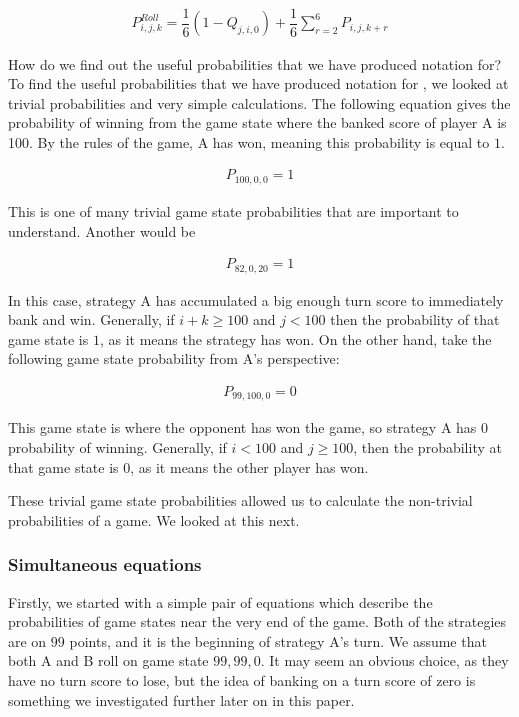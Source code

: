 \documentclass[a4paper,titlepage]{article}
\begin{document}
\begin{align*}
P^{Roll}_{i,j,k} = \dfrac{1}{6} (1-Q_{j,i,0}) + \dfrac{1}{6}\sum^{6}_{r=2}P_{i,j,k+r}
\end{align*}

How do we find out the useful probabilities that we have produced notation for? To find the useful probabilities that we have produced notation for , we looked at trivial probabilities and very simple calculations. The following equation gives the probability of winning from the game state where the banked score of player A is 100. By the rules of the game, A has won, meaning this probability is equal to $1$.

\begin{align*}
	P_{100,0,0}=1
\end{align*}

This is one of many trivial game state probabilities that are important to understand. Another would be

\begin{align*}
	P_{82,0,20}=1
\end{align*}

In this case, strategy A has accumulated a big enough turn score to immediately bank and win. Generally, if $i+k\geq100$ and $j<100$ then the probability of that game state is $1$, as it means the strategy has won. On the other hand, take the following game state probability from A's perspective:

\begin{align*}
	P_{99,100,0}=0
\end{align*}

This game state is where the opponent has won the game, so strategy A has $0$ probability of winning. Generally, if $i<100$ and $j\geq100$, then the probability at that game state is $0$, as it means the other player has won.

These trivial game state probabilities allowed us to calculate the non-trivial probabilities of a game. We looked at this next.

\subsubsection{Simultaneous equations}
Firstly, we started with a simple pair of equations which describe the probabilities of game states near the very end of the game. Both of the strategies are on $99$ points, and it is the beginning of strategy A's turn. We assume that both A and B roll on game state $99,99,0$. It may seem an obvious choice, as they have no turn score to lose, but the idea of banking on a turn score of zero is something we investigated further later on in this paper. 
\end{document}
